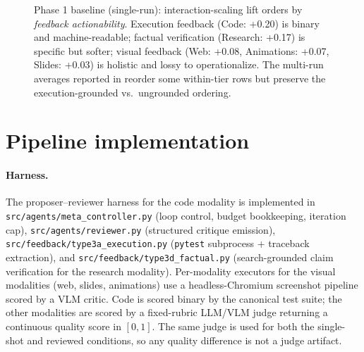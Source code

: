 \documentclass[11pt]{article}
\begin{document}
\begin{figure}[ht]
\centering
{}
\caption{Phase 1 baseline (single-run): interaction-scaling lift orders by \emph{feedback actionability}. Execution feedback (Code: +0.20) is binary and machine-readable; factual verification (Research: +0.17) is specific but softer; visual feedback (Web: +0.08, Animations: +0.07, Slides: +0.03) is holistic and lossy to operationalize. The multi-run averages reported in  reorder some within-tier rows but preserve the execution-grounded vs.\ ungrounded ordering.}
\label{fig:actionability}
\end{figure}

\section{Pipeline implementation}
\label{app:pipeline}

\paragraph{Harness.} The proposer--reviewer harness for the code modality is implemented in \texttt{src/agents/meta\_controller.py} (loop control, budget bookkeeping, iteration cap), \texttt{src/agents/reviewer.py} (structured critique emission), \texttt{src/feedback/type3a\_execution.py} (\texttt{pytest} subprocess + traceback extraction), and \texttt{src/feedback/type3d\_factual.py} (search-grounded claim verification for the research modality). Per-modality executors for the visual modalities (web, slides, animations) use a headless-Chromium screenshot pipeline scored by a VLM critic. Code is scored binary by the canonical test suite; the other modalities are scored by a fixed-rubric LLM/VLM judge returning a continuous quality score in $[0,1]$. The same judge is used for both the single-shot and reviewed conditions, so any quality difference is not a judge artifact.
\end{document}
